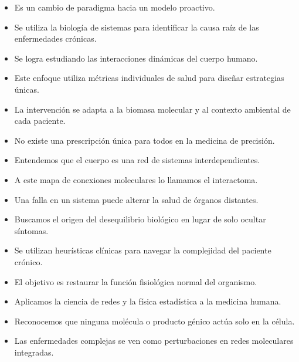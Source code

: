 

\begin{itemize}
    \item Es un cambio de paradigma hacia un modelo proactivo.
    \item Se utiliza la biología de sistemas para identificar la causa raíz de las enfermedades crónicas.
    \item Se logra estudiando las interacciones dinámicas del cuerpo humano.
\end{itemize}

\begin{itemize}
    \item Este enfoque utiliza métricas individuales de salud para diseñar estrategias únicas.
    \item La intervención se adapta a la biomasa molecular y al contexto ambiental de cada paciente.
    \item No existe una prescripción única para todos en la medicina de precisión.
\end{itemize}

\begin{itemize}
    \item Entendemos que el cuerpo es una red de sistemas interdependientes.
    \item A este mapa de conexiones moleculares lo llamamos el interactoma.
    \item Una falla en un sistema puede alterar la salud de órganos distantes.
\end{itemize}

\begin{itemize}
    \item Buscamos el origen del desequilibrio biológico en lugar de solo ocultar síntomas.
    \item Se utilizan heurísticas clínicas para navegar la complejidad del paciente crónico.
    \item El objetivo es restaurar la función fisiológica normal del organismo.
\end{itemize}

\begin{itemize}
    \item Aplicamos la ciencia de redes y la física estadística a la medicina humana.
    \item Reconocemos que ninguna molécula o producto génico actúa solo en la célula.
    \item Las enfermedades complejas se ven como perturbaciones en redes moleculares integradas.
\end{itemize}

